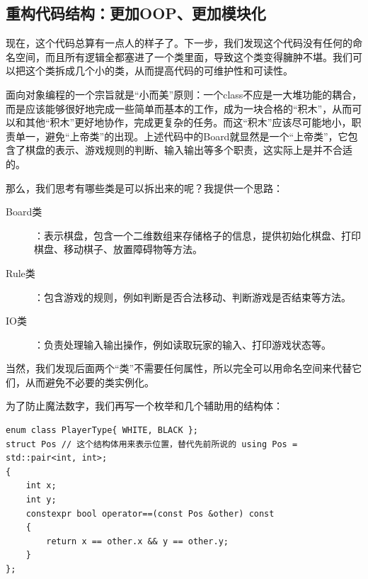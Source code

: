 \subsection{重构代码结构：更加OOP、更加模块化}

现在，这个代码总算有一点人的样子了。下一步，我们发现这个代码没有任何的命名空间，而且所有逻辑全都塞进了一个类里面，导致这个类变得臃肿不堪。我们可以把这个类拆成几个小的类，从而提高代码的可维护性和可读性。

面向对象编程的一个宗旨就是“小而美”原则：一个class不应是一大堆功能的耦合，而是应该能够很好地完成一些简单而基本的工作，成为一块合格的“积木”，从而可以和其他“积木”更好地协作，完成更复杂的任务。而这“积木”应该尽可能地小，职责单一，避免“上帝类”的出现。上述代码中的Board就显然是一个“上帝类”，它包含了棋盘的表示、游戏规则的判断、输入输出等多个职责，这实际上是并不合适的。

那么，我们思考有哪些类是可以拆出来的呢？我提供一个思路：
\begin{description}
  \item[Board类]：表示棋盘，包含一个二维数组来存储格子的信息，提供初始化棋盘、打印棋盘、移动棋子、放置障碍物等方法。
  \item[Rule类]：包含游戏的规则，例如判断是否合法移动、判断游戏是否结束等方法。
  \item[IO类]：负责处理输入输出操作，例如读取玩家的输入、打印游戏状态等。
\end{description}
当然，我们发现后面两个“类”不需要任何属性，所以完全可以用命名空间来代替它们，从而避免不必要的类实例化。

为了防止魔法数字，我们再写一个枚举和几个辅助用的结构体：
\begin{verbatim}
enum class PlayerType{ WHITE, BLACK };
struct Pos // 这个结构体用来表示位置，替代先前所说的 using Pos = std::pair<int, int>;
{
    int x;
    int y;
    constexpr bool operator==(const Pos &other) const
    {
        return x == other.x && y == other.y;
    }
};
\end{verbatim}

